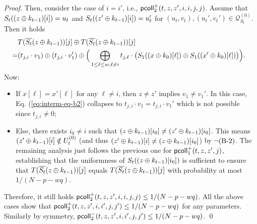 \begin{proof}
	
	Then, consider the case of $i=i'$, i.e., $\mathsf{pcoll}_{2}^+(t,z,z',i,i,j,j)$. Assume that $S_t((z\oplus k_{t-1})[i])=u_t$ and $S_t((z'\oplus k_{t-1})[i])=u_t'$ for $(u_t,v_t),(u_t',v_t')\in\mathcal{Q}_{S_t}^{(0)}$. Then it holds      {\small
		\begin{align}
		&   T(\overline{S_t}(z\oplus k_{t-1}))[j]\oplus T(\overline{S_t}(z\oplus k_{t-1}))[j]        \notag   \\
		= &
		(t_{j,i}\cdot v_1)
		\oplus
		(t_{j,i}\cdot v_1')
		\oplus
		\Big(\bigoplus_{1\leq\ell\leq w,\ell\neq i}t_{j,\ell}\cdot
		\big(S_1((x\oplus k_0)[\ell])\oplus S_1((x'\oplus k_0)[\ell])\big)\Big)    .
		\label{eq:interm-eq-b2}
		\end{align}
	}%
	Now:
	\begin{itemize}
		\item If $x[\ell]=x'[\ell]$ for any $\ell\neq i$, then $z\neq z'$ implies $v_1\neq v_1'$. In this case, Eq. (\ref{eq:interm-eq-b2}) collapses to $t_{j,i}\cdot v_1=t_{j,i}\cdot v_1'$ which is not possible since $t_{j,i}\neq 0$;
		\item Else, there exists $i_0\neq i$ such that $(z\oplus k_{t-1})[i_0]\neq(z'\oplus k_{t-1})[i_0]$. This means $(z'\oplus k_{t-1})[i]\notin U_t^{(0)}$ (and thus $(z'\oplus k_{t-1})[i]\neq(z\oplus k_{t-1})[i_0]$) by $\neg\text{(B-2)}$. The remaining analysis just follows the previous one for $\mathsf{pcoll}_{1}^+(t,z,z',j)$, establishing that the uniformness of $S_t((z\oplus k_{t-1})[i_0])$ is sufficient to ensure that $T(\overline{S_t}(z\oplus k_{t-1}))[j]$ equals $T(\overline{S_t}(z\oplus k_{t-1}))[j]$ with probability at most $1/(N-p-wq)$.
	\end{itemize}
	Therefore, it still holds $\mathsf{pcoll}_{2}^+(t,z,z',i,i,j,j)\leq1/(N-p-wq)$. All the above cases show that $\mathsf{pcoll}_{2}^+(t,z,z',i,i',j,j')\leq1/(N-p-wq)$ for any parameters. Similarly by symmetry, $\mathsf{pcoll}_{2}^-(t,z,z',i,i',j,j')\leq1/(N-p-wq)$.         \qed
\end{proof}





